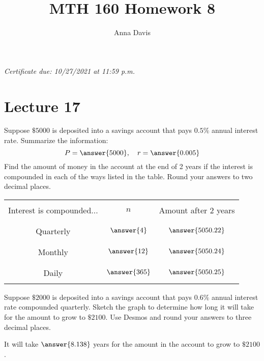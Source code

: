 \documentclass{ximera}
\author{Anna Davis} \title{MTH 160 Homework 8}
\begin{document}
\begin{abstract}

\end{abstract}
\maketitle
 \textit{Certificate due: 10/27/2021 at 11:59 p.m.}
 
 \section{Lecture 17}
 
  \begin{problem}\label{prob:160hom7prob4} 
  Suppose $\$5000$ is deposited into a savings account that pays $0.5\%$ annual interest rate.  
  Summarize the information:
  $$P=\answer{5000},\quad r=\answer{0.005}$$
  Find the amount of money in the account at the end of 2 years if the interest is compounded in each of the ways listed in the table.  Round your answers to two decimal places.
  \begin{center}
\begin{tabular}{|c|c|c|}
 \hline
 &&   \\
 Interest is compounded... & $n$ & Amount after 2 years \\
 &&  \\
  \hline
  &&  \\
 Quarterly & $\answer{4}$ & $\answer{5050.22}$ \\
  && \\
 \hline
  &&  \\
 Monthly & $\answer{12}$ & $\answer{5050.24}$ \\
  && \\
 \hline
  &&  \\
 Daily & $\answer{365}$ & $\answer{5050.25}$ \\
  && \\
 \hline
 \end{tabular}
\end{center}    
  \end{problem}
  
  \begin{problem}\label{prob:160hom7prob5} 
  Suppose $\$2000$ is deposited into a savings account that pays $0.6\%$ annual interest rate compounded quarterly.  Sketch the graph to determine how long it will take for the amount to grow to  $\$2100$.  Use Desmos and round your answers to three decimal places.
  
  \begin{center}  
\end{center}

It will take $\answer{8.138}$ years for the amount in the account to grow to $\$2100$.  
  \end{problem}
  
\end{document}
